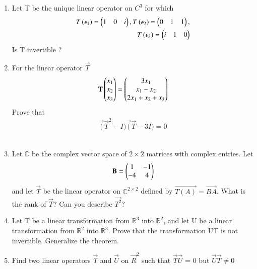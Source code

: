 \renewcommand{\theequation}{\theenumi}
\renewcommand{\thefigure}{\theenumi}
\begin{enumerate}[label=\thesubsection.\arabic*.,ref=\thesubsection.\theenumi]

%
\item Let T be the unique linear operator on $C^{3}$ for which 
   \begin{multline}
    \begin{aligned}
    T\left(\epsilon_1\right)=\begin{pmatrix}1&0&i\end{pmatrix} , T\left(\epsilon_2\right)=\begin{pmatrix}0&1&1\end{pmatrix} ,\\ T\left(\epsilon_3\right)=\begin{pmatrix}i&1&0\end{pmatrix} 
    \end{aligned}
    \end{multline}
    Is T invertible ?
%
\\
\solution

\item For the linear operator $\vec{T}$
\begin{align}
    \mathbf{T}\begin{pmatrix}x_1\\x_2\\x_3\end{pmatrix}=\begin{pmatrix}3x_1\\x_1-x_2\\2x_1+x_2+x_3\end{pmatrix}\label{eq:solutions/3/2/4/eq:1}
\end{align}
Prove that
\begin{align}
    \vec(\vec{T}^{2}-I)\vec(\vec{T}-3I)=0
\end{align}
%
\\
\solution

%
\item Let $\mathbb{C}$ be the complex vector space of $2\times2$ matrices with complex entries. Let
\begin{align}
	\mathbf{B} = \begin{pmatrix}1 & -1 \\ -4 & 4\end{pmatrix}
\end{align}
and let $\vec{T}$ be the linear operator on $\mathbb{C}^{2\times2}$  defined by $\vec{T(A)} = \vec{BA}$. What is the rank of $\vec{T}$? Can you describe $\vec{T^2}$?   
%
\\
\solution

%
\item Let T be a linear transformation from $\mathbb{R}^3$ into $\mathbb{R}^2$, and let U be a linear transformation from $\mathbb{R}^2$ into $\mathbb{R}^3$. Prove that the transformation UT is not invertible. Generalize the theorem.
%
\\
\solution

%
\item Find two linear operators $\vec{T}$ and $\vec{U}$ on $\vec{R}^2$ such that $\vec{T}\vec{U}$ = 0 but $\vec{U}\vec{T} \neq 0$
%
\\
\solution



\end{enumerate}
